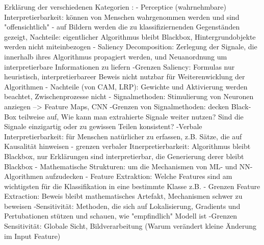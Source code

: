 Erklärung der verschiedenen Kategorien \cite{tjoa2020survey}:
- Perceptice (wahrnehmbare) Interpretierbarkeit: können von Menschen wahrgenommen werden und sind "offensichtlich" - auf Bildern werden die zu klassifiziernenden Gegenständen gezeigt, Nachteile: eigentlicher Algorithmus bleibt Blackbox, Hintergrundobjekte werden nicht miteinbezogen
- Saliency Decomposition: Zerlegung der Signale, die innerhalb ihres Algorithmus propagiert werden, und Neuanordnung um interpretierbare Informationen zu liefern 
-Grenzen Saliency: Formulas nur heuristisch, interpretierbareer Beweis nicht nutzbar für Weiterenwicklung der Algorithmen
- Nachteile (von CAM, LRP): Gewichte und Aktivierung werden beachtet, Zwischenprozesse nicht
- Signalmethoden: Stimulierung von Neuronen anziegen --> Feature Maps, CNN
-Grenzen von Signalmethoden: decken Black-Box teilweise auf, Wie kann man extrahierte Signale weiter nutzen? Sind die Signale einzigartig oder zu gewissen Teilen konsistent?
-Verbale Interpretierbarkeit: für Menschen natürlicher zu erfassen, z.B. Sätze, die auf Kausalität hinweisen
- grenzen verbaler Itnerpretierbarkeit: Algorithmus bleibt Blackbox, nur Erklärungen sind interpretierbar, die Generierung derer bleibt Blackbox
- Mathematische Strukturen: um die Mechanismen von ML- und NN-Algorithmen aufzudecken
- Feature Extraktion: Welche Features sind am wichtigsten für die Klassifikation in eine bestimmte Klasse z.B.
- Grenzen Feature Extraction: Beweis bleibt mathematisches Artefakt, Mechanismen schwer zu beweisen
-Sensitivität: Methoden, die sich auf Lokalisierung, Gradients und Pertubationen stützen und schauen, wie "empfindlich" Modell ist
-Grenzen Sensitivität: Globale Sicht, Bildverarbeitung (Warum verändert kleine Änderung im Input Feature)

